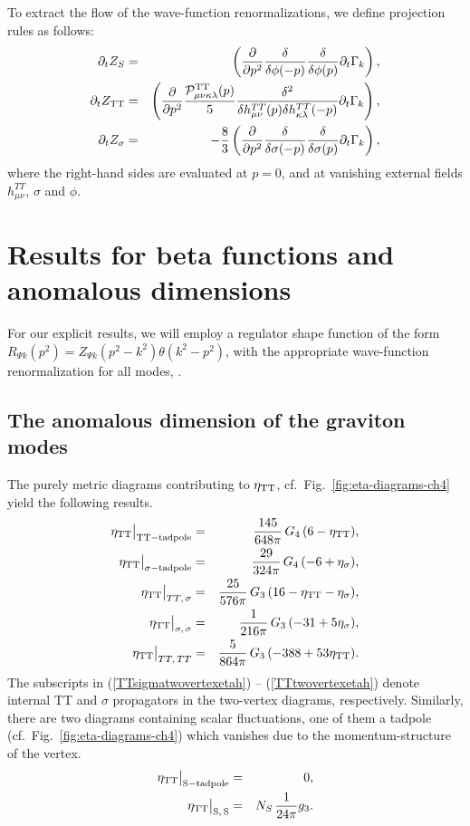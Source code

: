 \documentclass[11pt]{book} %
\newcommand{\bea}{\begin{eqnarray}}
\newcommand{\eea}{\end{eqnarray}}
\numberwithin{equation}{chapter}
\begin{document}
To extract the flow of the wave-function renormalizations, we define projection rules as follows:
\bea
\partial_t Z_S
&=& \left( \frac{\partial}{\partial p^2}\frac{\delta}{\delta \phi(-p)}\frac{\delta}{\delta \phi(p)} \partial_t \Gamma_k\right) ,\\
\partial_t Z_{\rm TT}
&=& \left( \frac{\partial}{\partial p^2} \frac{\mathcal P^{\rm TT}_{\mu \nu\kappa\lambda}(p)}{5} \frac{\delta^2}{\delta h^{TT}_{\mu \nu}(p) \delta h^{TT}_{\kappa \lambda}(-p)} \partial_t \Gamma_k\right),\\
\partial_t Z_{\sigma}
&=&-\frac{8}{3} \left( \frac{\partial}{\partial p^2}\frac{\delta}{\delta \sigma(-p)}\frac{\delta}{\delta \sigma(p)} \partial_t \Gamma_k\right),
\eea
where the right-hand sides are evaluated at $p=0$,
and at vanishing external fields $h_{\mu \nu}^{TT}$, $\sigma$ and $\phi$.


\section{Results for beta functions and anomalous dimensions}
For our explicit results, we will employ a regulator shape function of the form
$R_{\Psi k}\left(p^2\right) = Z_{\Psi k} (p^2-k^2) \theta(k^2-p^2)$,
with the appropriate wave-function renormalization for all modes,  \cite{Litim:2001up}.

\subsection{The anomalous dimension of the graviton modes}
%

The purely metric diagrams contributing to $\eta_{\rm TT}$,
cf.~Fig.~\ref{fig:eta-diagrams-ch4} yield the following results.
\bea
\eta_{\rm TT} \big|_{\rm TT-tadpole} &=& \frac{145}{648 \pi}\, G_4\, (6-\eta_{\rm TT} ),\\
\eta_{\rm TT}  \big|_{\sigma- \rm tadpole} &=&  \frac{29}{324 \pi}\, G_4\, (-6+\eta_{\sigma}),\\
\eta_{\rm TT}  \big|_{TT,\,\sigma} &=&  \frac{25}{576 \pi}\, G_3 \, (16-\eta_{\rm TT}-\eta_{\sigma}),\label{TTsigmatwovertexetah}\\
\eta_{\rm TT}  \big|_{\sigma,\,\sigma} &=&  \frac{1}{216 \pi}\, G_3 \, (-31+5\eta_{\sigma}),\label{sigmatwovertexetah}\\
\eta_{\rm TT}  \big|_{TT,\,TT} &=&  \frac{5}{864 \pi}\, G_3 \, (-388+53\eta_{\rm TT} ).\label{TTtwovertexetah}
\eea
 The subscripts in (\ref{TTsigmatwovertexetah}) -- (\ref{TTtwovertexetah})
denote internal TT and $\sigma$ propagators in the two-vertex diagrams, respectively.
Similarly, there are two diagrams containing scalar fluctuations,
one of them a tadpole (cf.~Fig.~\ref{fig:eta-diagrams-ch4}) which vanishes due to the
momentum-structure of the vertex.
\bea
\eta_{\rm TT}\big|_{\rm S-tadpole}  &=& 0,\\
\eta_{\rm TT}\big|_{\rm S,\,S}  &=& N_S \, \frac{1}{24 \pi} g_3.
\eea
\end{document}
